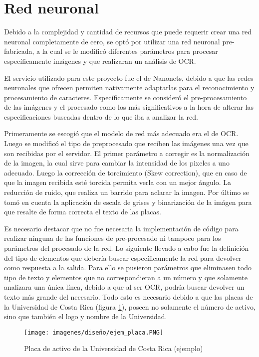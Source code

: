 \section{Red neuronal}
Debido a la complejidad y cantidad de recursos que puede requerir crear una red neuronal completamente de cero, se optó por utilizar una red neuronal pre-fabricada, a la cual se le modificó diferentes parámetros para procesar específicamente imágenes y que realizaran un análisis de OCR. 
\par
El servicio utilizado para este proyecto fue el de Nanonets, debido a que las redes neuronales que ofrecen permiten nativamente adaptarlas para el reconocimiento y procesamiento de caracteres. Específicamente se consideró el pre-procesamiento de las imágenes y el procesado como los más significativos a la hora de alterar las especificaciones buscadas dentro de lo que iba a analizar la red.
\par
Primeramente se escogió que el modelo de red más adecuado era el de OCR. Luego se modificó el tipo de preprocesado que reciben las imágenes una vez que son recibidas por el servidor. El primer parámetro a corregir es la normalización de la imagen, la cual sirve para cambiar la intensidad de los pixeles a uno adecuado. Luego la corrección de torcimiento (Skew correction), que en caso de que la imagen recibida esté torcida permita verla con un mejor ángulo. La reducción de ruido, que realiza un barrido para aclarar la imagen. Por último se tomó en cuenta la aplicación de escala de grises y binarización de la imágen para que resalte de forma correcta el texto de las placas.
\par
Es necesario destacar que no fue necesaria la implementación de código para realizar ninguna de las funciones de pre-procesado ni tampoco para los parámetros del procesado de la red. Lo siguiente llevado a cabo fue la definición del tipo de elementos que debería buscar específicamente la red para devolver como respuesta a la salida. Para ello se pusieron parámetros que eliminasen todo tipo de texto y elementos que no correspondieran a un número y que solamente analizara una única línea, debido a que al ser OCR, podría buscar devolver un texto más grande del necesario. Todo esto es necesario debido a que las placas de la Universidad de Costa Rica (figura \ref{ejem_placa}), poseen no solamente el número de activo, sino que también el logo y nombre de la Universidad.
\begin{figure}[H]
    \centering
    \texttt{[image: imagenes/diseño/ejem\_placa.PNG]}
    \caption{Placa de activo de la Universidad de Costa Rica (ejemplo)}
    \label{ejem_placa}
\end{figure}
